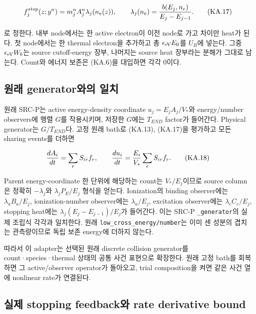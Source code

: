 \[
 f_j^{stop}(z;y^n)=m_j^nA_j^n\lambda_j(n_e(z)),\qquad
 \lambda_j(n_e)={b(E_j,n_e)\over E_j-E_{j-1}}.
 \tag{KA.17}
\]

로 정한다. 내부 node에서는 한 active electron이 이전 node로 가고 차이만 heat가 된다. 첫 node에서는 한 thermal electron을 추가하고 총 \(\epsilon_{\rm eV}E_0\)를 \(U_B\)에 넣는다. 그중 \(\epsilon_{\rm eV}W_b\)는 source cutoff-energy 장부, 나머지는 source heat 장부라는 분해가 그대로 남는다. Count와 에너지 보존은 (KA.6)을 대입하면 각각 0이다.

\hypertarget{uxc6d0uxb798-generatoruxc640uxc758-uxc77cuxce58}{%
\subsection{원래 generator와의 일치}\label{uxc6d0uxb798-generatoruxc640uxc758-uxc77cuxce58}}

원래 SRC-P는 active energy-density coordinate \(u_j=E_jA_j/V_*\)와 energy/number observers에 행렬 \(G\)를 작용시키며, 저장한 \(G\)에는 \(T_{END}\) factor가 들어간다. Physical generator는 \(G/T_{END}\)다. 고정 원래 bath로 (KA.13), (KA.17)을 평가하고 모든 sharing events를 더하면

\[
 {dA_i\over dt}=\sum_r S_{ir} f_r,\qquad
 {du_i\over dt}={E_i\over V_*}\sum_r S_{ir} f_r.
 \tag{KA.18}
\]

Parent energy-coordinate 한 단위에 해당하는 count는 \(V_*/E_j\)이므로 source column은 정확히 \(-\lambda_j\)와 \(\lambda_j P_E/E_j\) 형식을 얻는다. Ionization의 binding observer에는 \(\lambda_aB_a/E_j\), ionization-number observer에는 \(\lambda_a/E_j\), excitation observer에는 \(\lambda_cC_c/E_j\), stopping heat에는 \(\lambda_j(E_j-E_{j-1})/E_j\)가 들어간다. 이는 SRC-P \texttt{\_generator}의 실제 조립식 각각과 일치한다. 원래 \texttt{low\_cross\_energy/number}는 이미 센 성분의 겹치는 관측량이므로 독립 보존 energy에 더하지 않는다.

따라서 이 adapter는 선택된 원래 discrete collision generator를 count·species·thermal 상태의 공통 사건 표현으로 확장한다. 원래 고정 bath를 회복하면 그 active/observer operator가 돌아오고, trial composition을 켜면 같은 사건 열에 nonlinear rate가 연결된다.

\hypertarget{uxc2e4uxc81c-stopping-feedbackuxc640-rate-derivative-bound}{%
\subsection{실제 stopping feedback와 rate derivative bound}\label{uxc2e4uxc81c-stopping-feedbackuxc640-rate-derivative-bound}}

